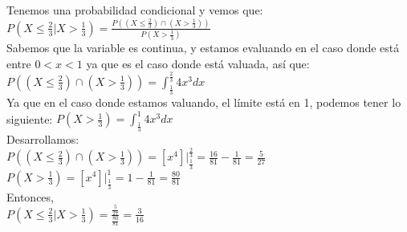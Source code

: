\documentclass[12pt,a4paper]{report}
\begin{document}
\begin{enumerate}
{			Tenemos una probabilidad condicional y vemos que:\\
			
			 $P(X \leq \frac{2}{3}|X > \frac{1}{3}) = \frac{P((X \leq \frac{2}{3}) \cap (X > \frac{1}{3}))}{P(X > \frac{1}{3})}$\\
			 
			 Sabemos que la variable es continua, y estamos evaluando en el caso donde está entre $ 0 < x < 1$ ya que es el caso donde está valuada,  así que:\\
			 
			 $P((X \leq \frac{2}{3}) \cap (X > \frac{1}{3})) = \int_{\frac{1}{3}}^{\frac{2}{3}} 4x^3 dx$ \\
			 
			 Ya que en el caso donde estamos valuando, el límite está en 1, podemos tener lo siguiente:
			 $P(X > \frac{1}{3}) = \int_{\frac{1}{3}}^{1} 4x^3 dx$\\
			 
			 Desarrollamos:\\
			 $P((X \leq \frac{2}{3}) \cap (X > \frac{1}{3})) = 
			 \left[x^4\right]\Big|_{\frac{1}{3}}^{\frac{2}{3}}=
			 \frac{16}{81} - \frac{1}{81} = \frac{5}{27}$\\
			 
			 $P(X > \frac{1}{3}) = 
			 \left[x^4\right]\Big|_{\frac{1}{3}}^{1}=
			 1 - \frac{1}{81} = \frac{80}{81}$\\
			 
			 Entonces,\\
			 $P(X \leq \frac{2}{3}|X > \frac{1}{3})
			 = \frac{\frac{5}{27}}{\frac{80}{81}}
			 = \frac{3}{16}$
			 
			 
			 
			 
		}
	\end{enumerate}
\end{document}
